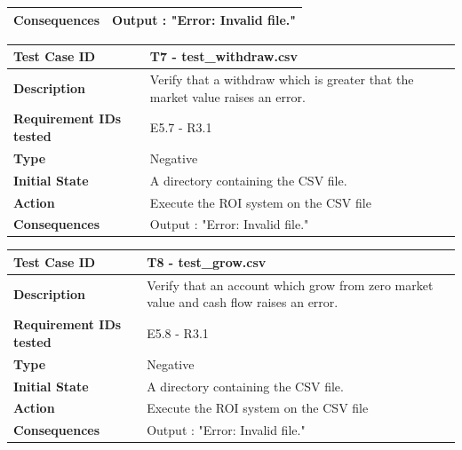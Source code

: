 \documentclass[runningheads,12pt]{article}
\begin{document}
{\begin{tabular}{|p{1.2in}|p{4in}|}
\textbf{Consequences} & Output : "Error: Invalid file." \\ 
\hline
\end{tabular}
\bigskip
\centering
\begin{tabular}{|p{1.2in}|p{4in}|}
\hline
\textbf{Test Case ID} & T7 - test\_withdraw.csv \\ 
\hline
\textbf{Description} & Verify that a withdraw which is greater that the market value raises an error.\\
\hline
\textbf{Requirement IDs tested} & E5.7 - R3.1 \\ 
\hline
\textbf{Type} & Negative \\ 
\hline
\textbf{Initial State} & A directory containing the CSV file.\\
\hline 
\textbf{Action} & Execute the ROI system on the CSV file \\
\hline 
\textbf{Consequences} & Output : "Error: Invalid file." \\ 
\hline
\end{tabular}
\bigskip
\centering
\begin{tabular}{|p{1.2in}|p{4in}|}
\hline
\textbf{Test Case ID} & T8 - test\_grow.csv \\ 
\hline
\textbf{Description} & Verify that an account which grow from zero market value and cash flow raises an error.\\
\hline
\textbf{Requirement IDs tested} & E5.8 - R3.1 \\ 
\hline
\textbf{Type} & Negative \\ 
\hline
\textbf{Initial State} & A directory containing the CSV file.\\
\hline 
\textbf{Action} & Execute the ROI system on the CSV file \\
\hline 
\textbf{Consequences} & Output : "Error: Invalid file." \\ 
\hline
\end{tabular}
}
\end{document}
